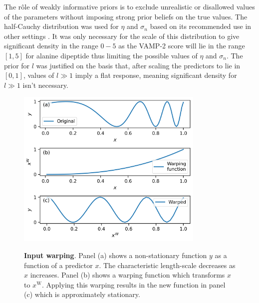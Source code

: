 The r\^ole of weakly informative priors is to exclude unrealistic or disallowed values of the parameters without imposing strong prior beliefs on the true values.\cite{gelmanBayesianDataAnalysis2014} The half-Cauchy distribution  was used for $\eta$ and $\sigma_n$  based on its recommended use in other settings \cite{polsonHalfCauchyPriorGlobal2012}. It was only necessary for the scale of this distribution to give significant density in the range $0-5$ as the VAMP-2 score will lie in the range $[1,5]$ for alanine dipeptide thus limiting the possible values of $\eta$ and $\sigma_{n}$. The prior for $l$ was justified on the basis that, after scaling the predictors to lie in $[0, 1]$, values of $l \gg 1$ imply a flat response, meaning significant density for $l \gg 1$ isn't necessary. 

\begin{figure}
    \centering
    \caption{\textbf{Input warping}. Panel (a) shows a non-stationary function $y$ as a function of a predictor $x$. The characteristic length-scale decreases as $x$ increases. Panel (b) shows a warping function which transforms $x$ to $x^\mathrm{W}$. Applying this warping results in the new function in panel (c) which is approximately stationary.}
    \includegraphics[width=0.8\textwidth]{chapters/msm_optimization/figures/warping_explainer.png}
    \label{fig:msm_warping_explainer}
\end{figure}

